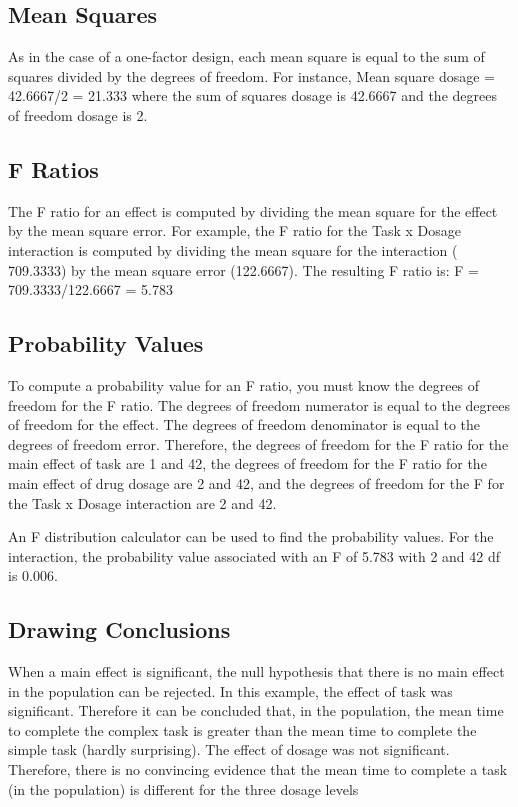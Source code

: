 \subsection{Mean Squares}
As in the case of a one-factor design, each mean square is equal to the sum of squares divided by the degrees of freedom. For instance, Mean square dosage = 42.6667/2 = 21.333 where the sum of squares dosage is 42.6667 and the degrees of freedom dosage is 2.


\subsection{F Ratios}
The F ratio for an effect is computed by dividing the mean square for the effect by the mean square error. For example, the F ratio for the Task x Dosage interaction is computed by dividing the mean square for the interaction ( 709.3333) by the mean square error (122.6667). The resulting F ratio is: F = 709.3333/122.6667 = 5.783


\subsection{Probability Values}
To compute a probability value for an F ratio, you must know the degrees of freedom for the F ratio. The degrees of freedom numerator is equal to the degrees of freedom for the effect. The degrees of freedom denominator is equal to the degrees of freedom error. Therefore, the degrees of freedom for the F ratio for the main effect of task are 1 and 42, the degrees of freedom for the F ratio for the main effect of drug dosage are 2 and 42, and the degrees of freedom for the F for the Task x Dosage interaction are 2 and 42.

An F distribution calculator can be used to find the probability values. For the interaction, the probability value associated with an F of 5.783 with 2 and 42 df is 0.006.

\subsection{Drawing Conclusions}

When a main effect is significant, the null hypothesis that there is no main effect in the population can be rejected. In this example, the effect of task was significant. Therefore it can be concluded that, in the population, the mean time to complete the complex task is greater than the mean time to complete the simple task (hardly surprising). The effect of dosage was not significant. Therefore, there is no convincing evidence that the mean time to complete a task (in the population) is different for the three dosage levels

